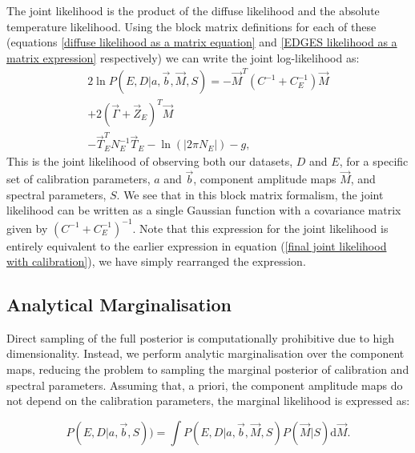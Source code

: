 \documentclass[fleqn,usenatbib]{mnras}
\begin{document}
The joint likelihood is the product of the diffuse likelihood and the absolute temperature likelihood. Using the block matrix definitions for each of these (equations \ref{diffuse likelihood as a matrix equation} and \ref{EDGES likelihood as a matrix expression} respectively) we can write the joint log-likelihood as:
\begin{equation}\label{joint likelihood as a matrix expression}
\begin{aligned}
    2\ln P(E,D|a,\Vec{b},\Vec{M},S) = -\Vec{M}^T\left(C^{-1} + C_E^{-1} \right) \Vec{M} \\ +2 \left(\Vec{\Gamma}+\Vec{Z}_E\right)^T \Vec{M} \\- \Vec{T}_E^T N_E^{-1} \Vec{T}_E - \ln\left(\left|2\pi N_E\right|\right) - g,
\end{aligned}
\end{equation}
This is the joint likelihood of observing both our datasets, $D$ and $E$, for a specific set of calibration parameters, $a$ and $\Vec{b}$, component amplitude maps $\Vec{M}$, and spectral parameters, $S$. We see that in this block matrix formalism, the joint likelihood can be written as a single Gaussian function with a covariance matrix given by $\left(C^{-1} + C_E^{-1} \right)^{-1}$. Note that this expression for the joint likelihood is entirely equivalent to the earlier expression in equation (\ref{final joint likelihood with calibration}), we have simply rearranged the expression.

\subsection{Analytical Marginalisation}
Direct sampling of the full posterior is computationally prohibitive due to high dimensionality. Instead, we perform analytic marginalisation over the component maps, reducing the problem to sampling the marginal posterior of calibration and spectral parameters. Assuming that, a priori, the component amplitude maps do not depend on the calibration parameters, the marginal likelihood is expressed as:

\begin{equation}\label{marginalisation integral}
    P(E,D|a,\Vec{b},S)) = \int{P(E,D|a,\Vec{b},\Vec{M},S)P(\Vec{M}|S)\mathrm{d}\Vec{M}}.              
\end{equation}  
\end{document}
